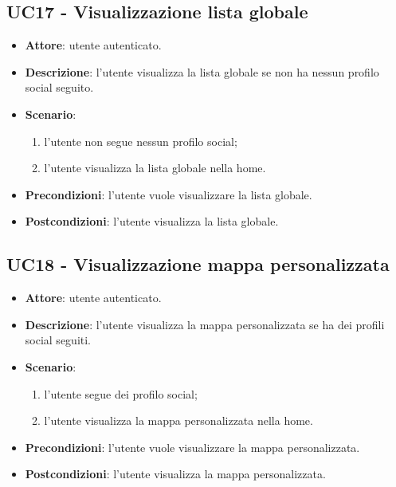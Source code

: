 \subsection{UC17 - Visualizzazione lista globale}
\begin{itemize}
    \item \textbf{Attore}: utente autenticato.
    \item \textbf{Descrizione}: l'utente visualizza la lista globale se non ha nessun profilo social seguito.
    \item \textbf{Scenario}:
    \begin{enumerate}
        \item l'utente non segue nessun profilo social;
        \item l'utente visualizza la lista globale nella home.
    \end{enumerate}

    \item \textbf{Precondizioni}: l'utente vuole visualizzare la lista globale.
    \item \textbf{Postcondizioni}: l'utente visualizza la lista globale.
\end{itemize}

\subsection{UC18 - Visualizzazione mappa personalizzata}
\begin{itemize}
    \item \textbf{Attore}: utente autenticato.
    \item \textbf{Descrizione}: l'utente visualizza la mappa personalizzata se ha dei profili social seguiti.
    \item \textbf{Scenario}:
    \begin{enumerate}
        \item l'utente segue dei profilo social;
        \item l'utente visualizza la mappa personalizzata nella home.
    \end{enumerate}

    \item \textbf{Precondizioni}: l'utente vuole visualizzare la mappa personalizzata.
    \item \textbf{Postcondizioni}: l'utente visualizza la mappa personalizzata.
\end{itemize}


